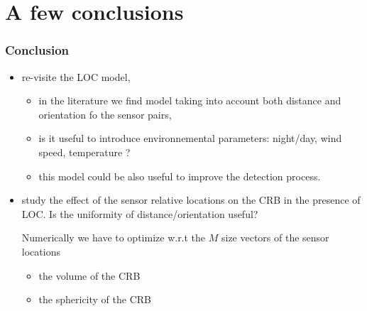 \documentclass[handout,9pt]{beamer}
\begin{document}
\section{A few conclusions}
\begin{frame}
 \frametitle{Conclusion}
\begin{itemize}
\item
re-visite the LOC model, 
\begin{itemize}
\item
in the literature we find model taking into account both distance and orientation fo the sensor pairs,
\item
is it useful to introduce environnemental parameters: night/day, wind speed, temperature ?
\item
this model could be also useful to improve the detection process.
\end{itemize}

\item
study the effect of the sensor relative locations on the CRB in the presence of LOC. Is the uniformity of
distance/orientation useful? 

Numerically we have to optimize w.r.t the $M$ size vectors of the sensor locations
  \begin{itemize}
\item
    the volume of the CRB 
\item
    the sphericity of the CRB
 \end{itemize}
 \end{itemize}
 
 \end{frame}
 
\end{document}
